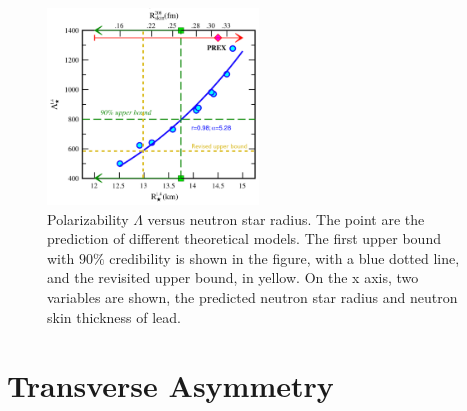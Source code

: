 \begin{figure}[hbtp]
\centering
\includegraphics[width = 0.5\textwidth]{Introduzione/UpdatedPlot.png}
\caption{ Polarizability $\Lambda$ versus neutron star radius. The point are the prediction of different theoretical models. The first upper bound with $90 \%$ credibility is shown in the figure, with a blue dotted line, and the revisited upper bound, in yellow. On the x axis, two variables are shown, the predicted neutron star radius and neutron skin thickness of lead.}
\label{fig:NeutronSkinandLambda}
\end{figure}


\section{Transverse Asymmetry}

